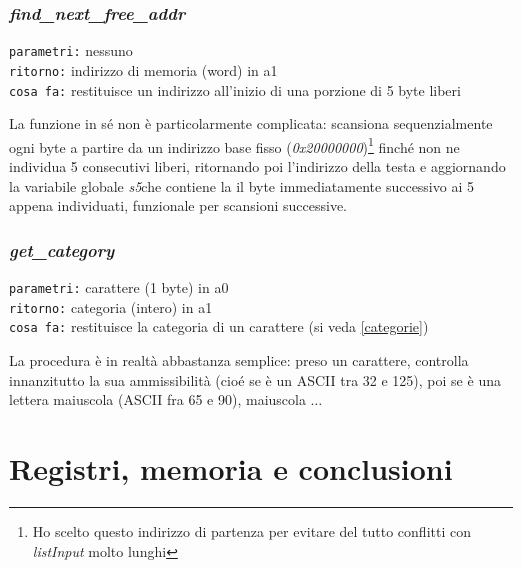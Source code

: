 \documentclass[11pt]{report}
\begin{document}
    \subsection{\textit{find\_next\_free\_addr}}

    \begin{mdframed}
            \texttt{parametri:} nessuno \\
             \texttt{ritorno:} indirizzo di memoria (word) in a1\\
             \texttt{cosa fa:} restituisce un indirizzo all'inizio di una porzione di 5 byte liberi
        \end{mdframed}

        La funzione in sé non è particolarmente complicata: scansiona sequenzialmente ogni byte a partire da un indirizzo base fisso (\textit{0x20000000})\footnote[1]{Ho scelto questo indirizzo di partenza per evitare del tutto conflitti con \textit{listInput} molto lunghi} finché non ne individua 5 consecutivi liberi, ritornando poi l'indirizzo della testa e aggiornando la variabile globale \textit{s5}che contiene la il byte immediatamente successivo ai 5 appena individuati, funzionale per scansioni successive. 
        
    \subsection{\textit{get\_category}}

    \begin{mdframed}
            \texttt{parametri:} carattere (1 byte) in a0 \\
             \texttt{ritorno:} categoria (intero) in a1 \\
             \texttt{cosa fa:} restituisce la categoria di un carattere \small(si veda \ref{categorie})
        \end{mdframed}

        La procedura è in realtà abbastanza semplice: preso un carattere, controlla innanzitutto la sua ammissibilità (cioé se è un ASCII tra 32 e 125), poi se è una lettera maiuscola (ASCII fra 65 e 90), maiuscola $\ldots$ \\


    \chapter{Registri, memoria e conclusioni}
\end{document}
